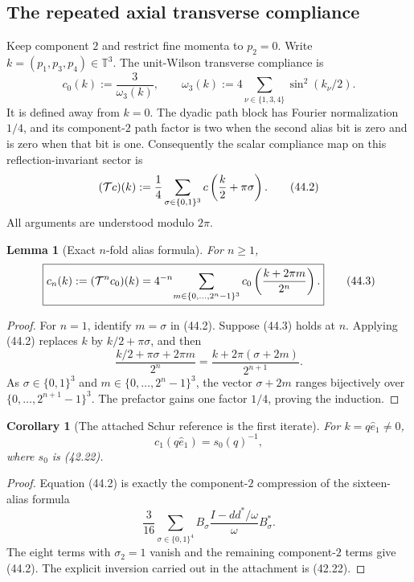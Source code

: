 \documentclass[11pt,oneside]{book}
\newtheorem{lemma}[theorem]{Lemma}
\newtheorem{corollary}[theorem]{Corollary}
\theoremstyle{definition}
\theoremstyle{remark}
\begin{document}
\subsection{The repeated axial transverse compliance}

Keep component \(2\) and restrict fine momenta to \(p_2=0\).  Write
\(k=(p_1,p_3,p_4)\in\mathbb T^3\).  The unit-Wilson transverse
compliance is
\[
 c_0(k)
 :=\frac{3}{\omega_3(k)},\qquad
 \omega_3(k):=
 4\sum_{\nu\in\{1,3,4\}}\sin^2(k_\nu/2).                       \tag{44.1}
\]
It is defined away from \(k=0\).  The dyadic path block has Fourier
normalization \(1/4\), and its component-\(2\) path factor is two
when the second alias bit is zero and is zero when that bit is one.
Consequently the scalar compliance map on this reflection-invariant
sector is
\[
 ({\cal T}c)(k)
 :=\frac14\sum_{\sigma\in\{0,1\}^3}
 c\left(\frac k2+\pi\sigma\right).                             \tag{44.2}
\]
All arguments are understood modulo \(2\pi\).

\begin{lemma}[Exact \(n\)-fold alias formula]
\label{lem:e8v44-nfold}
For \(n\ge1\),
\[
 \boxed{
 c_n(k):=({\cal T}^nc_0)(k)
 =4^{-n}\!
 \sum_{m\in\{0,\ldots,2^n-1\}^3}
 c_0\left(\frac{k+2\pi m}{2^n}\right).}                         \tag{44.3}
\]
\end{lemma}

\begin{proof}
For \(n=1\), identify \(m=\sigma\) in (44.2).  Suppose (44.3)
holds at \(n\).  Applying (44.2) replaces \(k\) by
\(k/2+\pi\sigma\), and then
\[
 \frac{k/2+\pi\sigma+2\pi m}{2^n}
 =\frac{k+2\pi(\sigma+2m)}{2^{n+1}}.
\]
As \(\sigma\in\{0,1\}^3\) and
\(m\in\{0,\ldots,2^n-1\}^3\), the vector
\(\sigma+2m\) ranges bijectively over
\(\{0,\ldots,2^{n+1}-1\}^3\).  The prefactor gains one factor
\(1/4\), proving the induction.
\end{proof}

\begin{corollary}[The attached Schur reference is the first iterate]
\label{cor:e8v44-first-iterate}
For \(k=q\widehat e_1\ne0\),
\[
 c_1(q\widehat e_1)=s_0(q)^{-1},                               \tag{44.4}
\]
where \(s_0\) is (42.22).
\end{corollary}

\begin{proof}
Equation (44.2) is exactly the component-\(2\) compression of the
sixteen-alias formula
\[
 \frac3{16}\sum_{\sigma\in\{0,1\}^4}
 B_\sigma\frac{I-dd^*/\omega}{\omega}B_\sigma^*.
\]
The eight terms with \(\sigma_2=1\) vanish and the remaining
component-\(2\) terms give (44.2).  The explicit inversion carried
out in the attachment is (42.22).
\end{proof}
\end{document}
